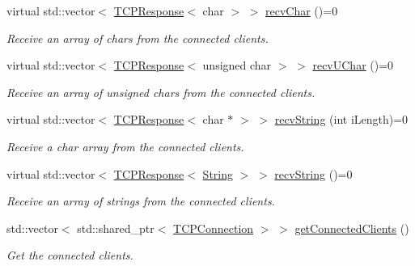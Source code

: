 \begin{DoxyCompactItemize}
virtual std\+::vector$<$ \hyperlink{class_rad_j_a_v_1_1_networking_1_1_t_c_p_response}{T\+C\+P\+Response}$<$ char $>$ $>$ \hyperlink{class_rad_j_a_v_1_1_networking_1_1_tcpip_server_a1e9b75bd3eccf46033d3c3b0a14c4ced}{recv\+Char} ()=0
\begin{DoxyCompactList}\small\item\em Receive an array of chars from the connected clients. \end{DoxyCompactList}\item 
virtual std\+::vector$<$ \hyperlink{class_rad_j_a_v_1_1_networking_1_1_t_c_p_response}{T\+C\+P\+Response}$<$ unsigned char $>$ $>$ \hyperlink{class_rad_j_a_v_1_1_networking_1_1_tcpip_server_ac4d92ac7eb86c234f4f46cb7c794c917}{recv\+U\+Char} ()=0
\begin{DoxyCompactList}\small\item\em Receive an array of unsigned chars from the connected clients. \end{DoxyCompactList}\item 
virtual std\+::vector$<$ \hyperlink{class_rad_j_a_v_1_1_networking_1_1_t_c_p_response}{T\+C\+P\+Response}$<$ char $\ast$ $>$ $>$ \hyperlink{class_rad_j_a_v_1_1_networking_1_1_tcpip_server_a20703e81091a1823c8d9f62c28785e48}{recv\+String} (int i\+Length)=0
\begin{DoxyCompactList}\small\item\em Receive a char array from the connected clients. \end{DoxyCompactList}\item 
virtual std\+::vector$<$ \hyperlink{class_rad_j_a_v_1_1_networking_1_1_t_c_p_response}{T\+C\+P\+Response}$<$ \hyperlink{class_rad_j_a_v_1_1_string}{String} $>$ $>$ \hyperlink{class_rad_j_a_v_1_1_networking_1_1_tcpip_server_a167e4f5fd04b01e43a00f99fd1227ce5}{recv\+String} ()=0
\begin{DoxyCompactList}\small\item\em Receive an array of strings from the connected clients. \end{DoxyCompactList}\item 
std\+::vector$<$ std\+::shared\+\_\+ptr$<$ \hyperlink{class_rad_j_a_v_1_1_networking_1_1_t_c_p_connection}{T\+C\+P\+Connection} $>$ $>$ \hyperlink{class_rad_j_a_v_1_1_networking_1_1_tcpip_server_a02492cac1eaf4ac14d2457666621fae5}{get\+Connected\+Clients} ()
\begin{DoxyCompactList}\small\item\em Get the connected clients. \end{DoxyCompactList}\item 

\end{DoxyCompactItemize}
